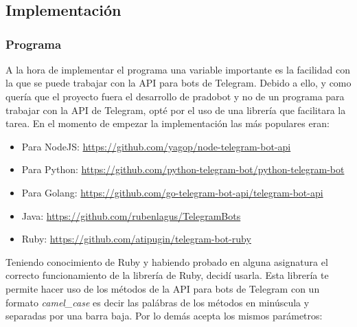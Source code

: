\chapter{}

\section{Implementación}

\subsection{Programa}
A la hora de implementar el programa una variable importante es la facilidad con la que se puede trabajar con la API para bots de Telegram. Debido a ello, y como quería que el proyecto fuera el desarrollo de pradobot y no de un programa para trabajar con la API de Telegram, opté por el uso de una librería que facilitara la tarea. En el momento de empezar la implementación las más populares eran:


\begin{itemize}
\item Para NodeJS: \url{https://github.com/yagop/node-telegram-bot-api}
\item Para Python: \url{https://github.com/python-telegram-bot/python-telegram-bot}
\item Para Golang: \url{https://github.com/go-telegram-bot-api/telegram-bot-api}
\item Java: \url{https://github.com/rubenlagus/TelegramBots}
\item Ruby: \url{https://github.com/atipugin/telegram-bot-ruby}
\end{itemize}

Teniendo conocimiento de Ruby y habiendo probado en alguna asignatura el correcto funcionamiento de la librería de Ruby, decidí usarla. Esta librería te permite hacer uso de los métodos de la API para bots de Telegram con un formato \textit{camel\_case} es decir las palábras de los métodos en minúscula y separadas por una barra baja. Por lo demás acepta los mismos parámetros:



